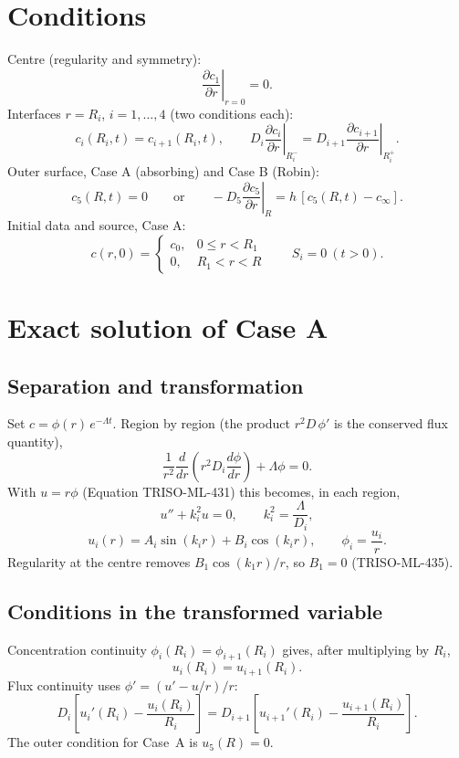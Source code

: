 \documentclass[11pt]{article}
\begin{document}
\section{Conditions}
Centre (regularity and symmetry):
\[
\left.\frac{\partial c_1}{\partial r}\right|_{r=0}=0 .
\]
Interfaces $r=R_i$, $i=1,\dots,4$ (two conditions each):
\[
c_i(R_i,t)=c_{i+1}(R_i,t),\qquad D_i\left.\frac{\partial c_i}{\partial r}\right|_{R_i^-}=D_{i+1}\left.\frac{\partial c_{i+1}}{\partial r}\right|_{R_i^+}.
\]
Outer surface, Case A (absorbing) and Case B (Robin):
\[
c_5(R,t)=0\qquad\text{or}\qquad -D_5\left.\frac{\partial c_5}{\partial r}\right|_R=h\,[c_5(R,t)-c_\infty].
\]
Initial data and source, Case A:
\[
c(r,0)=\begin{cases}c_0,&0\le r<R_1\\0,&R_1<r<R\end{cases}\qquad S_i=0\ (t>0).
\]

\section{Exact solution of Case A}\label{sec:exact}
\subsection{Separation and transformation}
Set $c=\phi(r)\,e^{-\Lambda t}$. Region by region (the product $r^2D\,\phi'$ is the conserved flux quantity),
\[
\frac{1}{r^2}\frac{d}{dr}\left(r^2D_i\frac{d\phi}{dr}\right)+\Lambda\phi=0 .
\]
With $u=r\phi$ (Equation TRISO-ML-431) this becomes, in each region,
\begin{equation}
u''+k_i^2u=0,\qquad k_i^2=\frac{\Lambda}{D_i},
\tag{TRISO-ML-432}
\end{equation}
\begin{equation}
u_i(r)=A_i\sin(k_ir)+B_i\cos(k_ir),\qquad \phi_i=\frac{u_i}{r}.
\tag{TRISO-ML-433}
\end{equation}
Regularity at the centre removes $B_1\cos(k_1r)/r$, so $B_1=0$ (TRISO-ML-435).

\subsection{Conditions in the transformed variable}
Concentration continuity $\phi_i(R_i)=\phi_{i+1}(R_i)$ gives, after multiplying by $R_i$,
\begin{equation}
u_i(R_i)=u_{i+1}(R_i).
\tag{TRISO-ML-439}
\end{equation}
Flux continuity uses $\phi'=(u'-u/r)/r$:
\begin{equation}
D_i\left[u_i'(R_i)-\frac{u_i(R_i)}{R_i}\right]=D_{i+1}\left[u_{i+1}'(R_i)-\frac{u_{i+1}(R_i)}{R_i}\right].
\tag{TRISO-ML-446}
\end{equation}
The outer condition for Case~A is $u_5(R)=0$.
\end{document}
